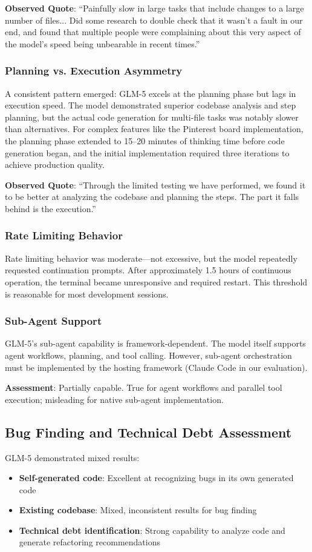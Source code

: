 \documentclass[conference]{IEEEtran}
\begin{document}
\textbf{Observed Quote}: ``Painfully slow in large tasks that include changes to a large number of files... Did some research to double check that it wasn't a fault in our end, and found that multiple people were complaining about this very aspect of the model's speed being unbearable in recent times.''

\subsubsection{Planning vs. Execution Asymmetry}
A consistent pattern emerged: GLM-5 excels at the planning phase but lags in execution speed. The model demonstrated superior codebase analysis and step planning, but the actual code generation for multi-file tasks was notably slower than alternatives. For complex features like the Pinterest board implementation, the planning phase extended to 15--20 minutes of thinking time before code generation began, and the initial implementation required three iterations to achieve production quality.

\textbf{Observed Quote}: ``Through the limited testing we have performed, we found it to be better at analyzing the codebase and planning the steps. The part it falls behind is the execution.''

\subsubsection{Rate Limiting Behavior}
Rate limiting behavior was moderate---not excessive, but the model repeatedly requested continuation prompts. After approximately 1.5 hours of continuous operation, the terminal became unresponsive and required restart. This threshold is reasonable for most development sessions.

\subsubsection{Sub-Agent Support}
GLM-5's sub-agent capability is framework-dependent. The model itself supports agent workflows, planning, and tool calling. However, sub-agent orchestration must be implemented by the hosting framework (Claude Code in our evaluation).

\textbf{Assessment}: Partially capable. True for agent workflows and parallel tool execution; misleading for native sub-agent implementation.

\subsection{Bug Finding and Technical Debt Assessment}
GLM-5 demonstrated mixed results:
\begin{itemize}
    \item \textbf{Self-generated code}: Excellent at recognizing bugs in its own generated code
    \item \textbf{Existing codebase}: Mixed, inconsistent results for bug finding
    \item \textbf{Technical debt identification}: Strong capability to analyze code and generate refactoring recommendations
\end{itemize}
\end{document}
